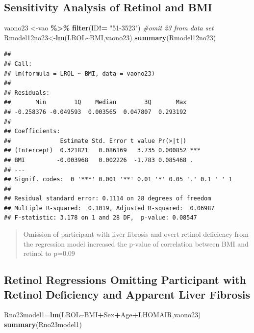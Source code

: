 \documentclass[
]{article}
\newenvironment{Shaded}{\begin{snugshade}}{\end{snugshade}}
\newcommand{\CommentTok}[1]{\textcolor[rgb]{0.56,0.35,0.01}{\textit{#1}}}
\newcommand{\FunctionTok}[1]{\textcolor[rgb]{0.13,0.29,0.53}{\textbf{#1}}}
\newcommand{\NormalTok}[1]{#1}
\newcommand{\OtherTok}[1]{\textcolor[rgb]{0.56,0.35,0.01}{#1}}
\newcommand{\SpecialCharTok}[1]{\textcolor[rgb]{0.81,0.36,0.00}{\textbf{#1}}}
\newcommand{\StringTok}[1]{\textcolor[rgb]{0.31,0.60,0.02}{#1}}
\begin{document}
\newpage

\subsection{Sensitivity Analysis of Retinol and
BMI}\label{sensitivity-analysis-of-retinol-and-bmi}

\begin{Shaded}
\begin{Highlighting}[]
\NormalTok{vaono23 }\OtherTok{\textless{}{-}}\NormalTok{vao }\SpecialCharTok{\%\textgreater{}\%} \FunctionTok{filter}\NormalTok{(ID}\SpecialCharTok{!=} \StringTok{"51{-}3523"}\NormalTok{) }\CommentTok{\#omit 23 from data set}
\NormalTok{Rmodel12no23}\OtherTok{\textless{}{-}}\FunctionTok{lm}\NormalTok{(LROL}\SpecialCharTok{\textasciitilde{}}\NormalTok{BMI,vaono23)}
\FunctionTok{summary}\NormalTok{(Rmodel12no23)}
\end{Highlighting}
\end{Shaded}

\begin{verbatim}
## 
## Call:
## lm(formula = LROL ~ BMI, data = vaono23)
## 
## Residuals:
##       Min        1Q    Median        3Q       Max 
## -0.258376 -0.049593  0.003565  0.047807  0.293192 
## 
## Coefficients:
##              Estimate Std. Error t value Pr(>|t|)    
## (Intercept)  0.321821   0.086169   3.735 0.000852 ***
## BMI         -0.003968   0.002226  -1.783 0.085468 .  
## ---
## Signif. codes:  0 '***' 0.001 '**' 0.01 '*' 0.05 '.' 0.1 ' ' 1
## 
## Residual standard error: 0.1114 on 28 degrees of freedom
## Multiple R-squared:  0.1019, Adjusted R-squared:  0.06987 
## F-statistic: 3.178 on 1 and 28 DF,  p-value: 0.08547
\end{verbatim}

\begin{quote}
Omission of participant with liver fibrosis and overt retinol deficiency
from the regression model increased the p-value of correlation between
BMI and retinol to p=0.09
\end{quote}

\subsection{Retinol Regressions Omitting Participant with Retinol
Deficiency and Apparent Liver
Fibrosis}\label{retinol-regressions-omitting-participant-with-retinol-deficiency-and-apparent-liver-fibrosis}

\begin{Shaded}
\begin{Highlighting}[]
\NormalTok{Rno23model1}\OtherTok{=}\FunctionTok{lm}\NormalTok{(LROL}\SpecialCharTok{\textasciitilde{}}\NormalTok{BMI}\SpecialCharTok{+}\NormalTok{Sex}\SpecialCharTok{+}\NormalTok{Age}\SpecialCharTok{+}\NormalTok{LHOMAIR,vaono23)}
\FunctionTok{summary}\NormalTok{(Rno23model1)}
\end{Highlighting}
\end{Shaded}
\end{document}
